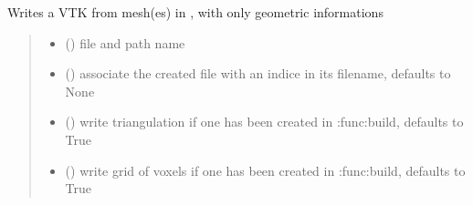 \documentclass[letterpaper,10pt,english]{sphinxmanual}
\begin{document}
\begin{fulllineitems}
\begin{fulllineitems}
\label{\detokenize{reference:LVM.LightVegeManager.VTK_nolight}}
\pysigstartsignatures
{}
\pysigstopsignatures
\sphinxAtStartPar
Writes a VTK from mesh(es) in , with only geometric informations
\begin{quote}\begin{description}
\begin{itemize}
\item {} 
\sphinxAtStartPar
{} () \textendash{} file and path name

\item {} 
\sphinxAtStartPar
{} (\sphinxstyleliteralemphasis{\sphinxupquote{, }}) \textendash{} associate the created file with an indice in its filename, defaults to None

\item {} 
\sphinxAtStartPar
{} (\sphinxstyleliteralemphasis{\sphinxupquote{, }}) \textendash{} write triangulation if one has been created in :func:build, defaults to True

\item {} 
\sphinxAtStartPar
{} (\sphinxstyleliteralemphasis{\sphinxupquote{, }}) \textendash{} write grid of voxels if one has been created in :func:build, defaults to True

\end{itemize}

\end{description}\end{quote}

\end{fulllineitems}


\end{fulllineitems}
\end{document}
